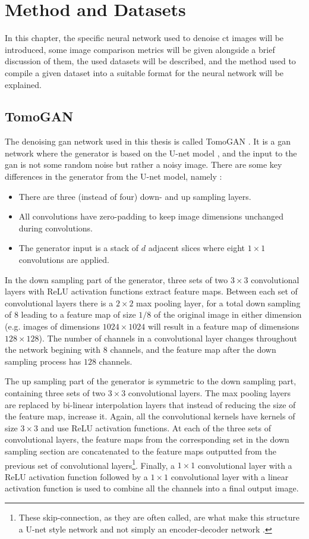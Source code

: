 \chapter{Method and Datasets}
\label{sec:method}
In this chapter, the specific neural network used to denoise \acrshort{ct} images will be introduced, some image comparison metrics will be given alongside a brief discussion of them, the used datasets will be described, and the method used to compile a given dataset into a suitable format for the neural network will be explained. 


\section{TomoGAN}
\label{sec:method:tomogan}
The denoising \acrshort{gan} network used in this thesis is called TomoGAN \cite{liu2020tomogan}. It is a \acrshort{gan} network where the generator is based on the U-net model \cite{unet}, and the input to the \acrshort{gan} is not some random noise but rather a noisy image. There are some key differences in the generator from the U-net model, namely \cite{liu2020tomogan}:
\begin{itemize}
    \item There are three (instead of four) down- and up sampling layers.
    \item All convolutions have zero-padding to keep image dimensions unchanged during convolutions.
    \item The generator input is a stack of $d$ adjacent slices where eight $1\times1$ convolutions are applied. 
\end{itemize}
In the down sampling part of the generator, three sets of two $3\times3$ convolutional layers with ReLU activation functions extract feature maps. Between each set of convolutional layers there is a $2\times2$ max pooling layer, for a total down sampling of $8$ leading to a feature map of size $1/8$ of the original image in either dimension (e.g. images of dimensions $1024\times1024$ will result in a feature map of dimensions $128\times128$). The number of channels in a convolutional layer changes throughout the network begining with $8$ channels, and the feature map after the down sampling process has $128$ channels. 

The up sampling part of the generator is symmetric to the down sampling part, containing three sets of two $3\times3$ convolutional layers. The max pooling layers are replaced by bi-linear interpolation layers that instead of reducing the size of the feature map, increase it. Again, all the convolutional kernels have kernels of size $3\times3$ and use ReLU activation functions. At each of the three sets of convolutional layers, the feature maps from the corresponding set in the down sampling section are concatenated to the feature maps outputted from the previous set of convolutional layers\footnote{These skip-connection, as they are often called, are what make this structure a U-net style network and not simply an encoder-decoder network \cite{unet}. }. Finally, a $1\times1$ convolutional layer with a ReLU activation function followed by a $1\times1$ convolutional layer with a linear activation function is used to combine all the channels into a final output image. 

